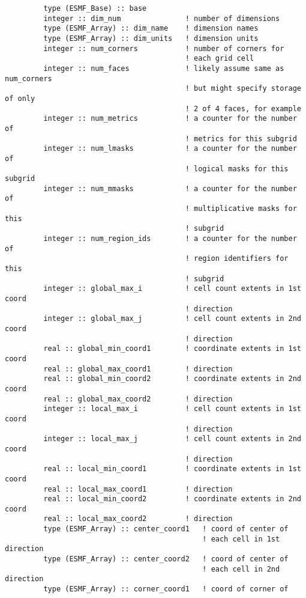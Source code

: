 \begin{verbatim}
         type (ESMF_Base) :: base
         integer :: dim_num               ! number of dimensions
         type (ESMF_Array) :: dim_name    ! dimension names
         type (ESMF_Array) :: dim_units   ! dimension units
         integer :: num_corners           ! number of corners for
                                          ! each grid cell
         integer :: num_faces             ! likely assume same as num_corners
                                          ! but might specify storage of only
                                          ! 2 of 4 faces, for example
         integer :: num_metrics           ! a counter for the number of
                                          ! metrics for this subgrid
         integer :: num_lmasks            ! a counter for the number of
                                          ! logical masks for this subgrid
         integer :: num_mmasks            ! a counter for the number of
                                          ! multiplicative masks for this
                                          ! subgrid
         integer :: num_region_ids        ! a counter for the number of
                                          ! region identifiers for this
                                          ! subgrid
         integer :: global_max_i          ! cell count extents in 1st coord
                                          ! direction
         integer :: global_max_j          ! cell count extents in 2nd coord
                                          ! direction
         real :: global_min_coord1        ! coordinate extents in 1st coord
         real :: global_max_coord1        ! direction
         real :: global_min_coord2        ! coordinate extents in 2nd coord
         real :: global_max_coord2        ! direction
         integer :: local_max_i           ! cell count extents in 1st coord
                                          ! direction
         integer :: local_max_j           ! cell count extents in 2nd coord
                                          ! direction
         real :: local_min_coord1         ! coordinate extents in 1st coord
         real :: local_max_coord1         ! direction
         real :: local_min_coord2         ! coordinate extents in 2nd coord
         real :: local_max_coord2         ! direction
         type (ESMF_Array) :: center_coord1   ! coord of center of
                                              ! each cell in 1st direction
         type (ESMF_Array) :: center_coord2   ! coord of center of
                                              ! each cell in 2nd direction
         type (ESMF_Array) :: corner_coord1   ! coord of corner of

\end{verbatim}
